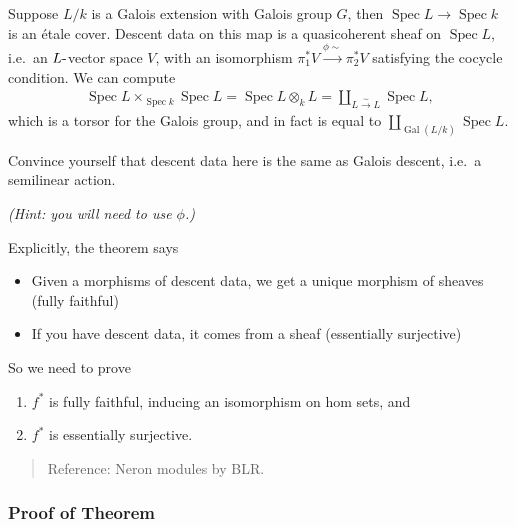 \begin{example}[?]

Suppose \(L/k\) is a Galois extension with Galois group \(G\), then
\(\operatorname{Spec}L \to \operatorname{Spec}k\) is an étale cover.
Descent data on this map is a quasicoherent sheaf on
\(\operatorname{Spec}L\), i.e.~an \(L{\hbox{-}}\)vector space \(V\),
with an isomorphism \(\pi_1^* V \xrightarrow{\phi \sim}\pi_2^* V\)
satisfying the cocycle condition. We can compute
\begin{align*}
\operatorname{Spec}L \times_{\operatorname{Spec}k} \operatorname{Spec}L = \operatorname{Spec}L\otimes_k L = {\coprod}_{L\xrightarrow{\sim} L} \operatorname{Spec}L
,\end{align*}
which is a torsor for the Galois group, and in fact is equal to
\({\coprod}_{\operatorname{Gal}(L/k)} \operatorname{Spec}L\).

\end{example}

\begin{exercise}[?]

Convince yourself that descent data here is the same as Galois descent,
i.e.~a semilinear action.

\emph{(Hint: you will need to use \(\phi\).)}

\end{exercise}

Explicitly, the theorem says

\begin{itemize}
\item
  Given a morphisms of descent data, we get a unique morphism of sheaves
  (fully faithful)
\item
  If you have descent data, it comes from a sheaf (essentially
  surjective)
\end{itemize}

So we need to prove

\begin{enumerate}
\def\labelenumi{\arabic{enumi}.}
\item
  \(f^*\) is fully faithful, inducing an isomorphism on hom sets, and
\item
  \(f^*\) is essentially surjective.
\end{enumerate}

\begin{quote}
Reference: Neron modules by BLR.
\end{quote}

\hypertarget{proof-of-theorem}{%
\subsubsection{Proof of Theorem}\label{proof-of-theorem}}

